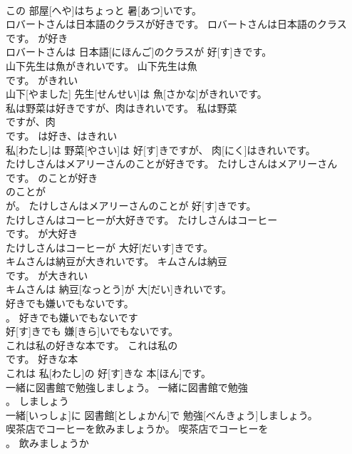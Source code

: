 \documentclass[8pt]{extreport}
\begin{document}
\begin{CJK}{UTF8}{min}
\\	この 部屋[へや]はちょっと 暑[あつ]いです。	
\\	ロバートさんは日本語のクラスが好きです。	ロバートさんは日本語のクラス
\\	です。	が好き	
\\	ロバートさんは 日本語[にほんご]のクラスが 好[す]きです。	
\\	山下先生は魚がきれいです。	山下先生は魚
\\	です。	がきれい	
\\	山下[やました] 先生[せんせい]は 魚[さかな]がきれいです。	
\\	私は野菜は好きですが、肉はきれいです。	私は野菜
\\	ですが、肉
\\	です。	は好き、はきれい	
\\	私[わたし]は 野菜[やさい]は 好[す]きですが、 肉[にく]はきれいです。	
\\	たけしさんはメアリーさんのことが好きです。	たけしさんはメアリーさん
\\	です。	のことが好き	
\\	のことが 
\\	が。	たけしさんはメアリーさんのことが 好[す]きです。	
\\	たけしさんはコーヒーが大好きです。	たけしさんはコーヒー
\\	です。	が大好き	
\\	たけしさんはコーヒーが 大好[だいす]きです。	
\\	キムさんは納豆が大きれいです。	キムさんは納豆
\\	です。	が大きれい	
\\	キムさんは 納豆[なっとう]が 大[だい]きれいです。	
\\	好きでも嫌いでもないです。	
\\	。	好きでも嫌いでもないです	
\\	好[す]きでも 嫌[きら]いでもないです。	
\\	これは私の好きな本です。	これは私の
\\	です。	好きな本	
\\	これは 私[わたし]の 好[す]きな 本[ほん]です。	
\\	一緒に図書館で勉強しましょう。	一緒に図書館で勉強
\\	。	しましょう	
\\	一緒[いっしょ]に 図書館[としょかん]で 勉強[べんきょう]しましょう。	
\\	喫茶店でコーヒーを飲みましょうか。	喫茶店でコーヒーを
\\	。	飲みましょうか	

\end{CJK}
\end{document}
